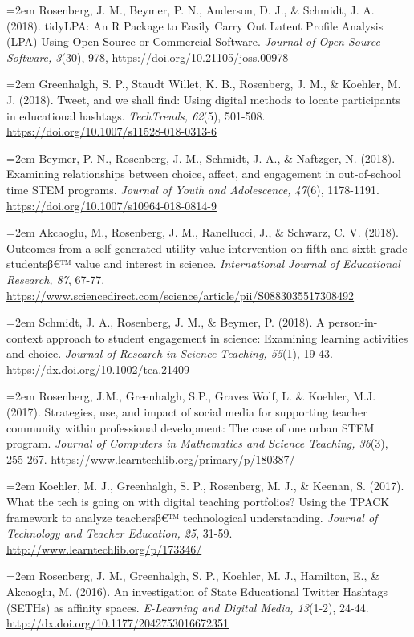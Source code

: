 \documentclass[]{article}
\newcommand{\euro}{€}
\begin{document}
\hangindent=2em Rosenberg, J. M., Beymer, P. N., Anderson, D. J., \&
Schmidt, J. A. (2018). tidyLPA: An R Package to Easily Carry Out Latent
Profile Analysis (LPA) Using Open-Source or Commercial Software.
\emph{Journal of Open Source Software, 3}(30), 978,
\url{https://doi.org/10.21105/joss.00978}

\hangindent=2em Greenhalgh, S. P., Staudt Willet, K. B., Rosenberg, J.
M., \& Koehler, M. J. (2018). Tweet, and we shall find: Using digital
methods to locate participants in educational hashtags.
\emph{TechTrends, 62}(5), 501-508.
\url{https://doi.org/10.1007/s11528-018-0313-6}

\hangindent=2em Beymer, P. N., Rosenberg, J. M., Schmidt, J. A., \&
Naftzger, N. (2018). Examining relationships between choice, affect, and
engagement in out-of-school time STEM programs. \emph{Journal of Youth
and Adolescence, 47}(6), 1178-1191.
\url{https://doi.org/10.1007/s10964-018-0814-9}

\hangindent=2em Akcaoglu, M., Rosenberg, J. M., Ranellucci, J., \&
Schwarz, C. V. (2018). Outcomes from a self-generated utility value
intervention on fifth and sixth-grade studentsβ\euro{}™ value and
interest in science. \emph{International Journal of Educational
Research, 87}, 67-77.
\url{https://www.sciencedirect.com/science/article/pii/S0883035517308492}

\hangindent=2em Schmidt, J. A., Rosenberg, J. M., \& Beymer, P. (2018).
A person-in-context approach to student engagement in science: Examining
learning activities and choice. \emph{Journal of Research in Science
Teaching, 55}(1), 19-43. \url{https://dx.doi.org/10.1002/tea.21409}

\hangindent=2em Rosenberg, J.M., Greenhalgh, S.P., Graves Wolf, L. \&
Koehler, M.J. (2017). Strategies, use, and impact of social media for
supporting teacher community within professional development: The case
of one urban STEM program. \emph{Journal of Computers in Mathematics and
Science Teaching, 36}(3), 255-267.
\url{https://www.learntechlib.org/primary/p/180387/}

\hangindent=2em Koehler, M. J., Greenhalgh, S. P., Rosenberg, M. J., \&
Keenan, S. (2017). What the tech is going on with digital teaching
portfolios? Using the TPACK framework to analyze teachersβ\euro{}™
technological understanding. \emph{Journal of Technology and Teacher
Education, 25}, 31-59. \url{http://www.learntechlib.org/p/173346/}

\hangindent=2em Rosenberg, J. M., Greenhalgh, S. P., Koehler, M. J.,
Hamilton, E., \& Akcaoglu, M. (2016). An investigation of State
Educational Twitter Hashtags (SETHs) as affinity spaces.
\emph{E-Learning and Digital Media, 13}(1-2), 24-44.
\url{http://dx.doi.org/10.1177/2042753016672351}
\end{document}
